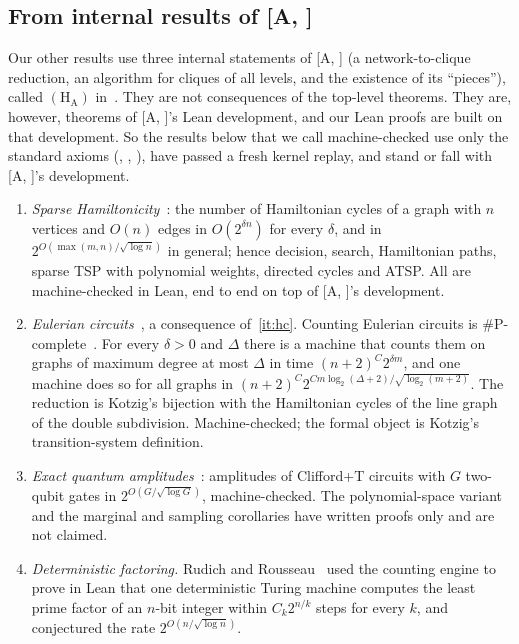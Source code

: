 \documentclass[10pt]{amsart}
\theoremstyle{plain}
\theoremstyle{definition}
\theoremstyle{remark}
\numberwithin{equation}{section}
\newcommand{\A}[1][]{\textup{[A\if\relax\detokenize{#1}\relax\else, #1\fi]}}
\newcommand{\HA}{\ensuremath{(\mathrm{H}_{\mathrm{A}})}}
\begin{document}
\subsection{From internal results of \texorpdfstring{\A}{[A]}}
Our other results use three internal statements of \A{} (a network-to-clique reduction, an
algorithm for cliques of all levels, and the existence of its ``pieces''), called \HA{}
in~\cite{Tulsyan26,TulsyanQ26}. They are not consequences of the top-level theorems. They are,
however, theorems of \A's Lean development, and our Lean proofs are built on that development. So
the results below that we call machine-checked use only the standard axioms (,
, ), have passed a fresh kernel replay, and stand or fall
with \A's development.
\begin{enumerate}[label=\textup{(\roman*)},resume]
\item\label{it:hc} \emph{Sparse Hamiltonicity}~\cite{Tulsyan26}: the number of Hamiltonian cycles of a graph with
$n$ vertices and $O(n)$ edges in $O(2^{\delta n})$ for every $\delta$, and in
$2^{O(\max(m,n)/\sqrt{\log n})}$ in general; hence decision, search, Hamiltonian paths, sparse TSP
with polynomial weights, directed cycles and ATSP. All are machine-checked in Lean, end to end on
top of \A's development.
\item \emph{Eulerian circuits}~\cite{TulsyanE26}, a consequence of~\ref{it:hc}. Counting Eulerian circuits
is $\#$P-complete~\cite{BW05}. For every $\delta>0$ and $\Delta$ there is a machine that counts
them on graphs of maximum degree at most $\Delta$ in time $(n+2)^C2^{\delta m}$, and one machine does so for all
graphs in $(n+2)^C2^{Cm\log_2(\Delta+2)/\sqrt{\log_2(m+2)}}$. The reduction is Kotzig's bijection
with the Hamiltonian cycles of the line graph of the double subdivision. Machine-checked; the
formal object is Kotzig's transition-system definition.
\item \emph{Exact quantum amplitudes}~\cite{TulsyanQ26}: amplitudes of Clifford+T circuits with $G$
two-qubit gates in $2^{O(G/\sqrt{\log G})}$, machine-checked. The polynomial-space variant and the
marginal and sampling corollaries have written proofs only and are not claimed.
\item\label{it:fact} \emph{Deterministic factoring.} Rudich and Rousseau~\cite{RR26} used the counting engine to
prove in Lean that one deterministic Turing machine computes the least prime factor of an $n$-bit
integer within $C_k2^{n/k}$ steps for every $k$, and conjectured the rate $2^{O(n/\sqrt{\log n})}$.

\end{enumerate}
\end{document}
